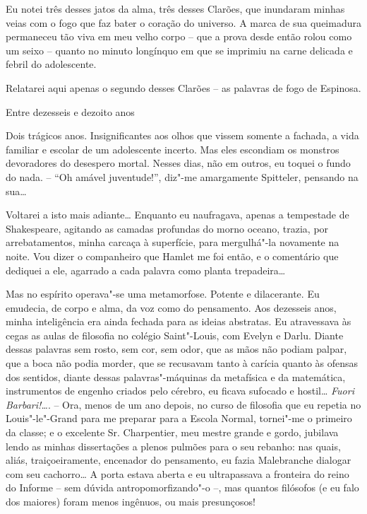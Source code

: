 Eu notei três desses jatos da alma, três desses Clarões, que inundaram
minhas veias com o fogo que faz bater o coração do universo. A marca de
sua queimadura permaneceu tão viva em meu velho corpo -- que a prova
desde então rolou como um seixo -- quanto no minuto longínquo em que se
imprimiu na carne delicada e febril do adolescente.

Relatarei aqui apenas o segundo desses Clarões -- as palavras de fogo de
Espinosa.

Entre dezesseis e dezoito anos

Dois trágicos anos. Insignificantes aos olhos que vissem somente a
fachada, a vida familiar e escolar de um adolescente incerto. Mas eles
escondiam os monstros devoradores do desespero mortal. Nesses dias, não
em outros, eu toquei o fundo do nada. -- ``Oh amável juventude!'',
diz"-me amargamente Spitteler, pensando na sua\ldots{}

Voltarei a isto mais adiante\ldots{} Enquanto eu naufragava, apenas a
tempestade de Shakespeare, agitando as camadas profundas do morno
oceano, trazia, por arrebatamentos, minha carcaça à superfície, para
mergulhá"-la novamente na noite. Vou dizer o companheiro que Hamlet me
foi então, e o comentário que dediquei a ele, agarrado a cada palavra
como planta trepadeira\ldots{}

Mas no espírito operava"-se uma metamorfose. Potente e dilacerante. Eu
emudecia, de corpo e alma, da voz como do pensamento. Aos dezesseis
anos, minha inteligência era ainda fechada para as ideias abstratas. Eu
atravessava às cegas as aulas de filosofia no colégio Saint"-Louis, com
Evelyn e Darlu. Diante dessas palavras sem rosto, sem cor, sem odor, que
as mãos não podiam palpar, que a boca não podia morder, que se recusavam
tanto à carícia quanto às ofensas dos sentidos, diante dessas
palavras"-máquinas da metafísica e da matemática, instrumentos de engenho
criados pelo cérebro, eu ficava sufocado e hostil\ldots{} \emph{Fuori
Barbari!\ldots{}}. -- Ora, menos de um ano depois, no curso de filosofia que
eu repetia no Louis"-le"-Grand para me preparar para a Escola Normal,
tornei"-me o primeiro da classe; e o excelente Sr. Charpentier, meu
mestre grande e gordo, jubilava lendo as minhas dissertações a plenos
pulmões para o seu rebanho: nas quais, aliás, traiçoeiramente, encenador
do pensamento, eu fazia Malebranche dialogar com seu cachorro\ldots{} A porta
estava aberta e eu ultrapassava a fronteira do reino do Informe -- sem
dúvida antropomorfizando"-o --, mas quantos filósofos (e eu falo dos
maiores) foram menos ingênuos, ou mais presunçosos!


